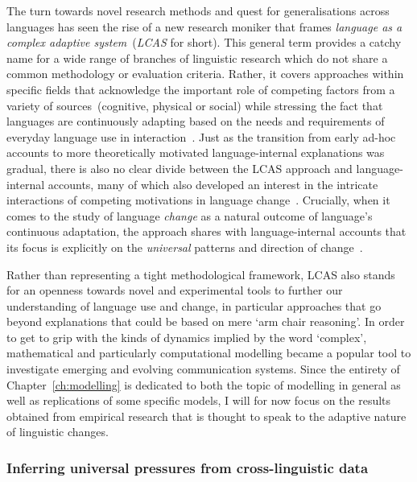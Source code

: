The turn towards novel research methods and quest for generalisations across languages has seen the rise of a new research moniker that frames \emph{language as a complex adaptive system}~(\emph{LCAS} for short). This general term provides a catchy name for a wide range of branches of linguistic research which do not share a common methodology or evaluation criteria. Rather, it covers approaches within specific fields that acknowledge the important role of competing factors from a variety of sources~(cognitive, physical or social) while stressing the fact that languages are continuously adapting based on the needs and requirements of everyday language use in interaction~\citep{LCAS2009}. Just as the transition from early ad-hoc accounts to more theoretically motivated language-internal explanations was gradual, there is also no clear divide between the LCAS approach and language-internal accounts, many of which also developed an interest in the intricate interactions of competing motivations in language change~\citep{Berg1998,Thomsen2006,MacWhinney2014}.
Crucially, when it comes to the study of language \emph{change} as a natural outcome of language's continuous adaptation, the approach shares with language-internal accounts that its focus is explicitly on the \emph{universal} patterns and direction of change~\citep[p.4-5]{LCAS2009}.

Rather than representing a tight methodological framework, LCAS also stands for an openness towards novel and experimental tools to further our understanding of language use and change, in particular approaches that go beyond explanations that could be based on mere `arm chair reasoning'. In order to get to grip with the kinds of dynamics implied by the word `complex', mathematical and particularly computational modelling became a popular tool to investigate emerging and evolving communication systems. Since the entirety of Chapter~\ref{ch:modelling} is dedicated to both the topic of modelling in general as well as replications of some specific models, I will for now focus on the results obtained from empirical research that is thought to speak to the adaptive nature of linguistic changes.

\subsubsection{Inferring universal pressures from cross-linguistic data}

